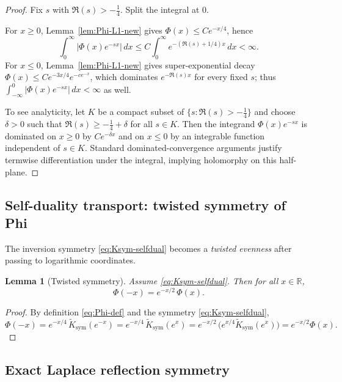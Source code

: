 \documentclass[12pt]{amsart}
\newtheorem{lemma}[theorem]{Lemma}
\theoremstyle{definition}
\theoremstyle{remark}
\begin{document}
\begin{proof}
Fix $s$ with $\Re(s)>-\tfrac14$. Split the integral at $0$.

For $x\ge0$, Lemma~\ref{lem:Phi-L1-new} gives $\Phi(x)\le C e^{-x/4}$, hence
\[
\int_0^\infty |\Phi(x)e^{-sx}|\,dx
\le
C\int_0^\infty e^{-(\Re(s)+1/4)x}\,dx
<
\infty.
\]
For $x\le0$, Lemma~\ref{lem:Phi-L1-new} gives super-exponential decay
$\Phi(x)\le C e^{-3x/4}e^{-c e^{-x}}$, which dominates $e^{-\Re(s)x}$ for every fixed $s$;
thus $\int_{-\infty}^0 |\Phi(x)e^{-sx}|\,dx<\infty$ as well.

To see analyticity, let $K$ be a compact subset of $\{s:\Re(s)>-\tfrac14\}$ and choose
$\delta>0$ such that $\Re(s)\ge -\tfrac14+\delta$ for all $s\in K$. Then the integrand
$\Phi(x)e^{-sx}$ is dominated on $x\ge0$ by $C e^{-\delta x}$ and on $x\le0$ by an integrable
function independent of $s\in K$. Standard dominated-convergence arguments justify
termwise differentiation under the integral, implying holomorphy on this half-plane.
\end{proof}

\subsection{Self-duality transport: twisted symmetry of Phi}
\label{subsec:twisted-symmetry}

The inversion symmetry \eqref{eq:Ksym-selfdual} becomes a \emph{twisted evenness} after passing
to logarithmic coordinates.

\begin{lemma}[Twisted symmetry]
\label{lem:Phi-twisted}
Assume \eqref{eq:Ksym-selfdual}. Then for all $x\in\mathbb R$,
\begin{equation}
\label{eq:Phi-twisted}
\Phi(-x)=e^{-x/2}\,\Phi(x).
\end{equation}
\end{lemma}

\begin{proof}
By definition \eqref{eq:Phi-def} and the symmetry \eqref{eq:Ksym-selfdual},
\[
\Phi(-x)
=
e^{-x/4}\,\widetilde K_{\mathrm{sym}}(e^{-x})
=
e^{-x/4}\,\widetilde K_{\mathrm{sym}}(e^{x})
=
e^{-x/2}\,\big(e^{x/4}\widetilde K_{\mathrm{sym}}(e^{x})\big)
=
e^{-x/2}\Phi(x).
\]
\end{proof}

\subsection{Exact Laplace reflection symmetry}
\label{subsec:laplace-reflection}
\end{document}
